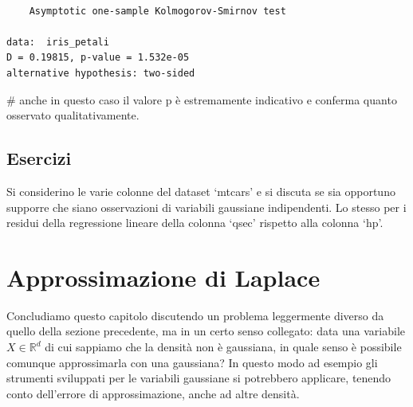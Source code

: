 \documentclass[
  italian,
  letterpaper,
]{book}
\newenvironment{Shaded}{\begin{snugshade}}{\end{snugshade}}
\newcommand{\CommentTok}[1]{\textcolor[rgb]{0.37,0.37,0.37}{#1}}
\newcommand{\R}{\mathbb{R}}
\theoremstyle{definition}
\theoremstyle{remark}
\begin{document}
\begin{verbatim}

    Asymptotic one-sample Kolmogorov-Smirnov test

data:  iris_petali
D = 0.19815, p-value = 1.532e-05
alternative hypothesis: two-sided
\end{verbatim}

\begin{Shaded}
\begin{Highlighting}[]
\CommentTok{\# anche in questo caso il valore p è estremamente indicativo e conferma quanto osservato qualitativamente.}
\end{Highlighting}
\end{Shaded}

\subsection{Esercizi}\label{esercizi-31}

Si considerino le varie colonne del dataset `mtcars' e si discuta se sia
opportuno supporre che siano osservazioni di variabili gaussiane
indipendenti. Lo stesso per i residui della regressione lineare della
colonna `qsec' rispetto alla colonna `hp'.

\section{Approssimazione di Laplace}\label{sec-laplace}

Concludiamo questo capitolo discutendo un problema leggermente diverso
da quello della sezione precedente, ma in un certo senso collegato: data
una variabile \(X \in \R^d\) di cui sappiamo che la densità non è
gaussiana, in quale senso è possibile comunque approssimarla con una
gaussiana? In questo modo ad esempio gli strumenti sviluppati per le
variabili gaussiane si potrebbero applicare, tenendo conto dell'errore
di approssimazione, anche ad altre densità.
\end{document}
